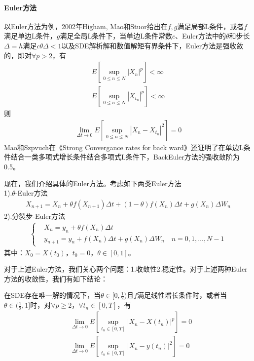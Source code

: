         \paragraph{Euler方法}
        以Euler方法为例，2002年Higham, Mao和Stuor\cite{2002.Higham}给出在$f,g$满足局部L条件，或者$f$满足单边L条件，$g$满足全局L条件下，当单边L条件常数$c$、Euler方法中的$\theta$和步长$\Delta = h$满足$c\theta\Delta <1$以及SDE解析解和数值解矩有界条件下，Euler方法是强收敛的，即对$\forall p>2$，有
        \begin{align*}
            E \left[ \sup_{0 \leqslant n \leqslant N}|X_n|^p \right] < \infty\\
            E \left[ \sup_{0 \leqslant n \leqslant N}|X_{t_n}|^p \right] < \infty
        \end{align*}
        则
        \begin{align*}
            \lim_{\Delta t \rightarrow 0}E\left[\sup_{0 \leqslant n \leqslant N}|X_n - X_{t_n}|^2 \right] = 0
        \end{align*}
        Mao和Szpvuch在《Strong Convergance rates for back ward》还证明了在单边L条件结合一类多项式增长条件结合多项式L条件下，BackEuler方法的强收敛阶为0.5。
        \par
        现在，我们介绍具体的Euler方法。考虑如下两类Euler方法\\
        1).$\theta$-Euler方法
        \begin{align*}
        X_{n+1} = X_n + \theta f(X_{n+1})\Delta t + (1-\theta)f(X_n)\Delta t+ g(X_n)\Delta W_n
        \end{align*}
        2).分裂步-Euler方法
        \begin{align*}
            \left\{
                \begin{aligned}
                &X_n = y_n + \theta f(X_n)\Delta t\\
                &y_{n+1} = y_n +f(X_n)\Delta t+g(X_n)\Delta W_n\quad n = 0,1,\dots,N-1
                \end{aligned}
            \right.
        \end{align*}
        其中：$X_0 = X(t_0)$，$t_0 = 0$，$\theta\in [0,1]$。
        \par
        对于上述Euler方法，我们关心两个问题：1.收敛性2.稳定性。对于上述两种Euler方法的收敛性，我们有如下结论：
        \begin{theorem}[Euler方法的收敛性]
        在SDE存在唯一解的情况下，当$\theta\in [0,\frac 12 )$且$f$满足线性增长条件时，或者当$\theta\in (\frac 12 ,1]$时，对$\forall p \geqslant 2$，$\forall t_n\in[0,T]$，有
        \begin{align*}
        &\lim_{\Delta t \rightarrow 0}E\left[\sup_{t_n \in[0,T]}|X_n - X(t_n)|^p \right] = 0\\
        &\lim_{\Delta t \rightarrow 0}E\left[\sup_{t_n \in[0,T]}|X_n - y(t_n)|^2 \right] = 0
        \end{align*}
        \end{theorem}
